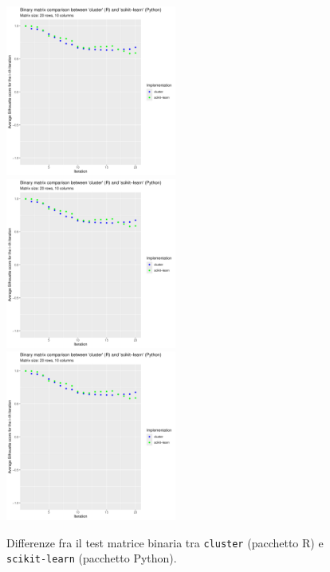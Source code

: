 \documentclass[a4paper, 12pt]{report}
\begin{document}
			\begin{figure}[H]
				\centering
				\includegraphics[width = 0.5\textwidth, height = 0.3\textheight, page = 1]{results/Final_comparison.pdf}
				\includegraphics[width = 0.5\textwidth, height = 0.3\textheight, page = 2]{results/Final_comparison.pdf}
				\includegraphics[width = 0.5\textwidth, height = 0.3\textheight, page = 3]{results/Final_comparison.pdf}
				\caption{Differenze fra il test matrice binaria tra \texttt{cluster} (pacchetto R)
				e \texttt{scikit-learn} (pacchetto Python).}
				\label{fig:cmp}
			\end{figure}
\end{document}
